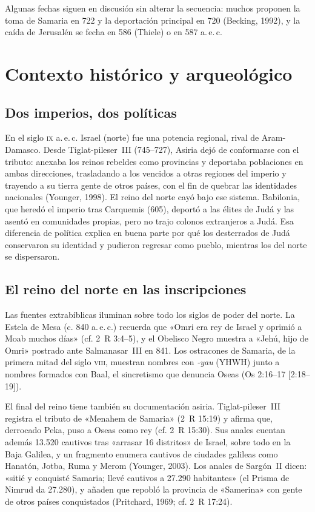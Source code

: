 \documentclass[11pt,letterpaper]{article}
\begin{document}
Algunas fechas siguen en discusión sin alterar la secuencia: muchos proponen la toma de Samaria en 722 y la deportación principal en 720 (Becking, 1992), y la caída de Jerusalén se fecha en 586 (Thiele) o en 587 a.\,e.\,c.

\section{Contexto histórico y arqueológico}

\subsection{Dos imperios, dos políticas}
En el siglo \textsc{ix} a.\,e.\,c. Israel (norte) fue una potencia regional, rival de Aram-Damasco. Desde Tiglat-pileser~III (745--727), Asiria dejó de conformarse con el tributo: anexaba los reinos rebeldes como provincias y deportaba poblaciones en ambas direcciones, trasladando a los vencidos a otras regiones del imperio y trayendo a su tierra gente de otros países, con el fin de quebrar las identidades nacionales (Younger, 1998). El reino del norte cayó bajo ese sistema. Babilonia, que heredó el imperio tras Carquemis (605), deportó a las élites de Judá y las asentó en comunidades propias, pero no trajo colonos extranjeros a Judá. Esa diferencia de política explica en buena parte por qué los desterrados de Judá conservaron su identidad y pudieron regresar como pueblo, mientras los del norte se dispersaron.

\subsection{El reino del norte en las inscripciones}
Las fuentes extrabíblicas iluminan sobre todo los siglos de poder del norte. La Estela de Mesa (c. 840 a.\,e.\,c.) recuerda que «Omri era rey de Israel y oprimió a Moab muchos días» (cf. 2~R 3:4--5), y el Obelisco Negro muestra a «Jehú, hijo de Omri» postrado ante Salmanasar~III en 841. Los ostracones de Samaria, de la primera mitad del siglo \textsc{viii}, muestran nombres con \emph{-yau} (YHWH) junto a nombres formados con Baal, el sincretismo que denuncia Oseas (Os 2:16--17 [2:18--19]).



El final del reino tiene también su documentación asiria. Tiglat-pileser~III registra el tributo de «Menahem de Samaria» (2~R 15:19) y afirma que, derrocado Peka, puso a Oseas como rey (cf. 2~R 15:30). Sus anales cuentan además 13.520 cautivos tras «arrasar 16 distritos» de Israel, sobre todo en la Baja Galilea, y un fragmento enumera cautivos de ciudades galileas como Hanatón, Jotba, Ruma y Merom (Younger, 2003). Los anales de Sargón~II dicen: «sitié y conquisté Samaria; llevé cautivos a 27.290 habitantes» (el Prisma de Nimrud da 27.280), y añaden que repobló la provincia de «Samerina» con gente de otros países conquistados (Pritchard, 1969; cf. 2~R 17:24).
\end{document}

